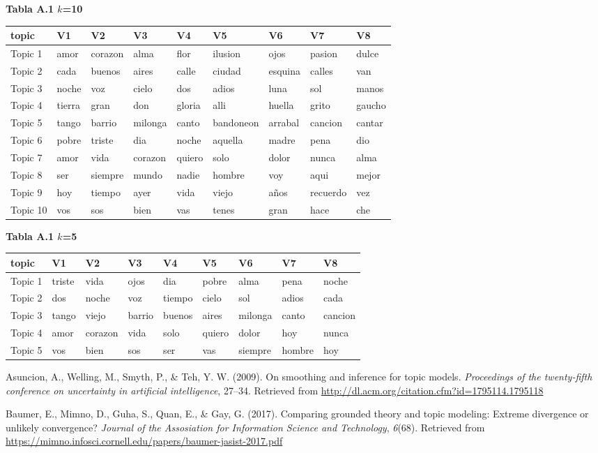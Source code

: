 \documentclass[]{article}
\begin{document}
\textbf{Tabla A.1 \(k\)=10}

\begin{longtable}[]{@{}lllllllll@{}}
\toprule
topic & V1 & V2 & V3 & V4 & V5 & V6 & V7 & V8\tabularnewline
\midrule
\endhead
Topic 1 & amor & corazon & alma & flor & ilusion & ojos & pasion &
dulce\tabularnewline
Topic 2 & cada & buenos & aires & calle & ciudad & esquina & calles &
van\tabularnewline
Topic 3 & noche & voz & cielo & dos & adios & luna & sol &
manos\tabularnewline
Topic 4 & tierra & gran & don & gloria & alli & huella & grito &
gaucho\tabularnewline
Topic 5 & tango & barrio & milonga & canto & bandoneon & arrabal &
cancion & cantar\tabularnewline
Topic 6 & pobre & triste & dia & noche & aquella & madre & pena &
dio\tabularnewline
Topic 7 & amor & vida & corazon & quiero & solo & dolor & nunca &
alma\tabularnewline
Topic 8 & ser & siempre & mundo & nadie & hombre & voy & aqui &
mejor\tabularnewline
Topic 9 & hoy & tiempo & ayer & vida & viejo & años & recuerdo &
vez\tabularnewline
Topic 10 & vos & sos & bien & vas & tenes & gran & hace &
che\tabularnewline
\bottomrule
\end{longtable}

\textbf{Tabla A.1 \(k\)=5}

\begin{longtable}[]{@{}lllllllll@{}}
\toprule
topic & V1 & V2 & V3 & V4 & V5 & V6 & V7 & V8\tabularnewline
\midrule
\endhead
Topic 1 & triste & vida & ojos & dia & pobre & alma & pena &
noche\tabularnewline
Topic 2 & dos & noche & voz & tiempo & cielo & sol & adios &
cada\tabularnewline
Topic 3 & tango & viejo & barrio & buenos & aires & milonga & canto &
cancion\tabularnewline
Topic 4 & amor & corazon & vida & solo & quiero & dolor & hoy &
nunca\tabularnewline
Topic 5 & vos & bien & sos & ser & vas & siempre & hombre &
hoy\tabularnewline
\bottomrule
\end{longtable}

\hypertarget{refs}{}
\hypertarget{ref-asuncion}{}
Asuncion, A., Welling, M., Smyth, P., \& Teh, Y. W. (2009). On smoothing
and inference for topic models. \emph{Proceedings of the twenty-fifth
conference on uncertainty in artificial intelligence}, 27--34. Retrieved
from \url{http://dl.acm.org/citation.cfm?id=1795114.1795118}

\hypertarget{ref-baumer}{}
Baumer, E., Mimno, D., Guha, S., Quan, E., \& Gay, G. (2017). Comparing
grounded theory and topic modeling: Extreme divergence or unlikely
convergence? \emph{Journal of the Assosiation for Information Science
and Technology}, \emph{6}(68). Retrieved from
\url{https://mimno.infosci.cornell.edu/papers/baumer-jasist-2017.pdf}
\end{document}

